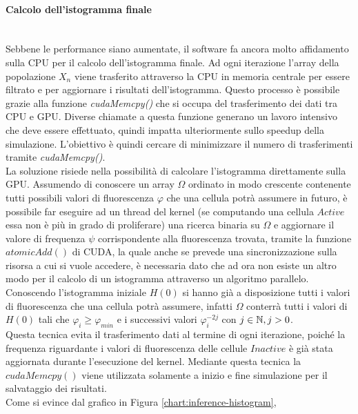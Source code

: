\paragraph{Calcolo dell'istogramma finale}\mbox{}
\\
Sebbene le performance siano aumentate, il software fa ancora molto affidamento
sulla CPU per il calcolo dell'istogramma finale.
Ad ogni iterazione l'array della popolazione $X_{n}$ viene trasferito
attraverso la CPU in memoria centrale per essere filtrato e per aggiornare i
risultati dell'istogramma. Questo processo è possibile grazie alla funzione
\textit{cudaMemcpy()} che si occupa del trasferimento dei dati tra CPU e GPU.
Diverse chiamate a questa funzione generano un lavoro intensivo che deve essere
effettuato, quindi impatta ulteriormente sullo speedup della simulazione.
L'obiettivo è quindi cercare di minimizzare il numero di trasferimenti tramite
\textit{cudaMemcpy()}.
\\
La soluzione risiede nella possibilità di calcolare l'istogramma direttamente
sulla GPU. Assumendo di conoscere un array $\Omega$ ordinato in modo crescente
contenente tutti possibili valori di fluorescenza
$\varphi$ che una cellula potrà assumere in futuro, è possibile far eseguire
ad un thread del kernel (se computando una cellula $Active$ essa non è più in
grado di proliferare) una ricerca binaria su $\Omega$ e aggiornare
il valore di frequenza $\psi$ corrispondente alla fluorescenza trovata, tramite
la funzione $atomicAdd()$ di CUDA, la quale anche se prevede una
sincronizzazione sulla risorsa a cui si vuole accedere, è necessaria dato che
ad ora non esiste un altro modo per il calcolo di un istogramma attraverso un
algoritmo parallelo.
\\
Conoscendo l'istogramma iniziale $H(0)$ si hanno già a disposizione
tutti i valori di fluorescenza che una cellula potrà assumere, infatti
$\Omega$ conterrà tutti i valori di $H(0)$ tali che $\varphi_{i} \geqslant
\varphi_{min}$ e i successivi valori $\varphi_{i}^{-2j}$ con $j \in \mathbb{N}, j > 0$.
\\
Questa tecnica evita il trasferimento dati al termine di ogni iterazione, poiché
la frequenza riguardante i valori di fluorescenza delle cellule $Inactive$
è già stata aggiornata durante l'esecuzione del kernel.
Mediante questa tecnica la $cudaMemcpy()$ viene utilizzata solamente a inizio
e fine simulazione per il salvataggio dei risultati.
\\
Come si evince dal grafico in Figura \ref{chart:inference-histogram}, 
